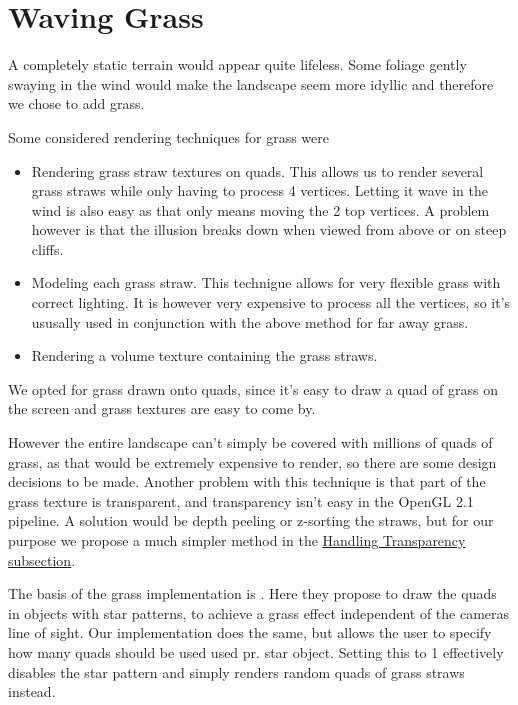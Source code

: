 \chapter{Waving Grass}


A completely static terrain would appear quite lifeless. Some foliage
gently swaying in the wind would make the landscape seem more idyllic
and therefore we chose to add grass.

Some considered rendering techniques for grass were

\begin{itemize}
\item Rendering grass straw textures on quads. This allows us to
  render several grass straws while only having to process 4
  vertices. Letting it wave in the wind is also easy as that only
  means moving the 2 top vertices. A problem however is that the
  illusion breaks down when viewed from above or on steep cliffs.
\item Modeling each grass straw. This technigue allows for very
  flexible grass with correct lighting. It is however very expensive
  to process all the vertices, so it's ususally used in conjunction
  with the above method for far away grass.
\item Rendering a volume texture containing the grass straws.
\end{itemize}

We opted for grass drawn onto quads, since it's easy to draw a quad of
grass on the screen and grass textures are easy to come by.

However the entire landscape can't simply be covered with millions of
quads of grass, as that would be extremely expensive to render, so
there are some design decisions to be made. Another problem with this
technique is that part of the grass texture is transparent, and
transparency isn't easy in the OpenGL 2.1 pipeline. A solution would
be depth peeling or z-sorting the straws, but for our purpose we
propose a much simpler method in the
\hyperref[sec:transparency]{Handling Transparency subsection}.

The basis of the grass implementation is
. Here they propose to draw the quads in
objects with star patterns, to achieve a grass effect independent of
the cameras line of sight. Our implementation does the same, but
allows the user to specify how many quads should be used used pr. star
object. Setting this to 1 effectively disables the star pattern and
simply renders random quads of grass straws instead.

